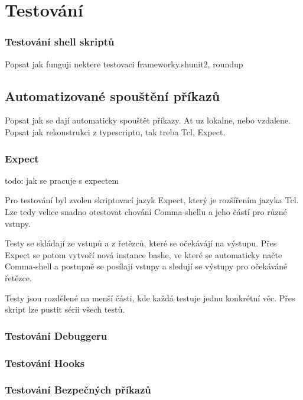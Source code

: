 \documentclass[thesis=M,czech]{FITthesis}[2012/06/26]
\begin{document}
%
%
\chapter{Testování}


\subsection{Testování shell skriptů}
Popsat jak funguji nektere testovaci frameworky.shunit2, roundup


\section{Automatizované spouštění příkazů}
Popsat jak se dají automaticky spouštět příkazy. At uz lokalne, nebo vzdalene. Popsat jak rekonstrukci z typescriptu, tak treba Tcl, Expect.

\subsection{Expect}
todo: jak se pracuje s expectem

Pro testování byl zvolen skriptovací jazyk Expect, který je rozšířením jazyka Tcl. Lze tedy velice snadno otestovat chování Comma-shellu a jeho částí pro různé vstupy.

Testy se skládají ze vstupů a z řetězců, které se očekávájí na výstupu. Přes Expect se potom vytvoří nová instance bashe, ve které se automaticky načte Comma-shell a postupně se posílají vstupy a sledují se výstupy pro očekáváné řetězce.

Testy jsou rozdělené na menší části, kde každá testuje jednu konkrétní věc. Přes skript lze pustit sérii všech testů.

\subsection{Testování Debuggeru}

\subsection{Testování Hooks}

\subsection{Testování Bezpečných příkazů}
\end{document}
